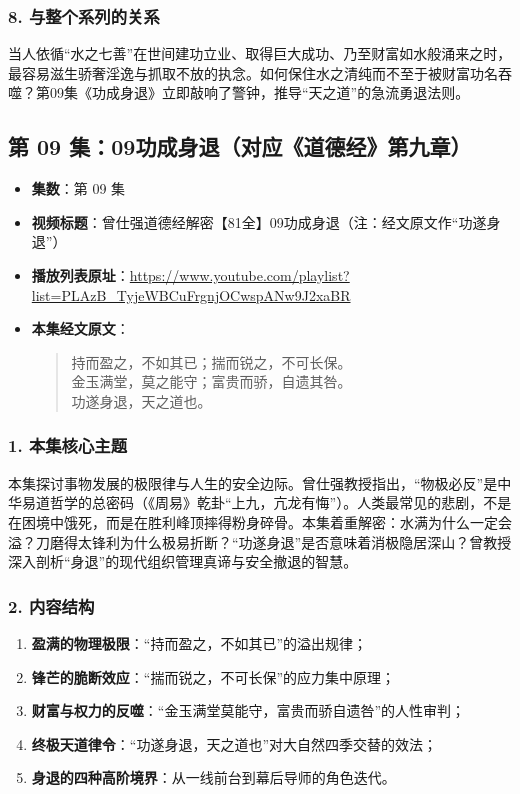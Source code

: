 \subsubsection{8. 与整个系列的关系}
当人依循“水之七善”在世间建功立业、取得巨大成功、乃至财富如水般涌来之时，最容易滋生骄奢淫逸与抓取不放的执念。如何保住水之清纯而不至于被财富功名吞噬？第09集《功成身退》立即敲响了警钟，推导“天之道”的急流勇退法则。

\clearpage

\subsection{第 09 集：09功成身退（对应《道德经》第九章）}
\label{sec:ep09}

\begin{itemize}
    \item \textbf{集数}：第 09 集
    \item \textbf{视频标题}：曾仕强道德经解密【81全】09功成身退（注：经文原文作“功遂身退”）
    \item \textbf{播放列表原址}：\url{https://www.youtube.com/playlist?list=PLAzB_TyjeWBCuFrgnjOCwspANw9J2xaBR}
    \item \textbf{本集经文原文}：
    \begin{quote}\kaishu
    持而盈之，不如其已；揣而锐之，不可长保。\\
    金玉满堂，莫之能守；富贵而骄，自遗其咎。\\
    功遂身退，天之道也。
    \end{quote}
\end{itemize}

\subsubsection{1. 本集核心主题}
本集探讨事物发展的极限律与人生的安全边际。曾仕强教授指出，“物极必反”是中华易道哲学的总密码（《周易》乾卦“上九，亢龙有悔”）。人类最常见的悲剧，不是在困境中饿死，而是在胜利峰顶摔得粉身碎骨。本集着重解密：水满为什么一定会溢？刀磨得太锋利为什么极易折断？“功遂身退”是否意味着消极隐居深山？曾教授深入剖析“身退”的现代组织管理真谛与安全撤退的智慧。

\subsubsection{2. 内容结构}
\begin{enumerate}
    \item \textbf{盈满的物理极限}：“持而盈之，不如其已”的溢出规律；
    \item \textbf{锋芒的脆断效应}：“揣而锐之，不可长保”的应力集中原理；
    \item \textbf{财富与权力的反噬}：“金玉满堂莫能守，富贵而骄自遗咎”的人性审判；
    \item \textbf{终极天道律令}：“功遂身退，天之道也”对大自然四季交替的效法；
    \item \textbf{身退的四种高阶境界}：从一线前台到幕后导师的角色迭代。
\end{enumerate}

